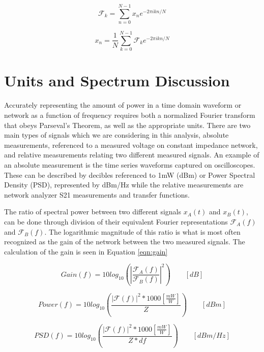 \begin{equation}
\mathcal{F}_{k} = \sum_{n=0}^{N-1} x_{n}e^{-2\pi ikn/N}
\label{eqn:DFT}
\end{equation}

\begin{equation}
x_{n} = \frac{1}{N}\sum_{k=0}^{N-1} \mathcal{F}_{k}e^{-2\pi ikn/N}
\label{eqn:DFT}
\end{equation}

\section{Units and Spectrum Discussion}

	Accurately representing the amount of power in a time domain waveform or network as a function of frequency requires both a normalized Fourier transform that obeys Parseval's Theorem, as well as the appropriate units.  There are two main types of signals which we are considering in this analysis, absolute measurements, referenced to a measured voltage on constant impedance network, and relative measurements relating two different measured signals.  An example of an absolute measurement is the time series waveforms captured on oscilloscopes.  These can be described by decibles referenced to 1mW (dBm) or Power Spectral Density (PSD), represented by dBm/Hz   while the relative measurements are network analyzer S21 measurements and transfer functions.

	The ratio of spectral power between two different signals $x_{A}(t)$ and $x_{B}(t)$, can be done through division of their equivalent Fourier representations $\mathcal{F}_{A}(f)$ and $\mathcal{F}_{B}(f)$.  The logarithmic magnitude of this ratio is what is most often recognized as the gain of the network between the two measured signals.  The calculation of the gain is seen in Equation \ref{eqn:gain}
	
\begin{equation}
Gain(f) = 10log_{10}(|\frac{\mathcal{F}_{A}(f)}{\mathcal{F}_{B}(f)}|^{2}) \qquad [dB]
\label{eqn:gain}
\end{equation}

\begin{equation}
Power(f) = 10log_{10}(\frac{|\mathcal{F}(f)|^{2} * 1000[\frac{mW}{W}]} {Z})\qquad [dBm]
\label{PSD}
\end{equation}
	
\begin{equation}
PSD(f) = 10log_{10}(\frac{|\mathcal{F}(f)|^{2} * 1000[\frac{mW}{W}]} {Z*df})\qquad [dBm/Hz]
\label{PSD}
\end{equation}


